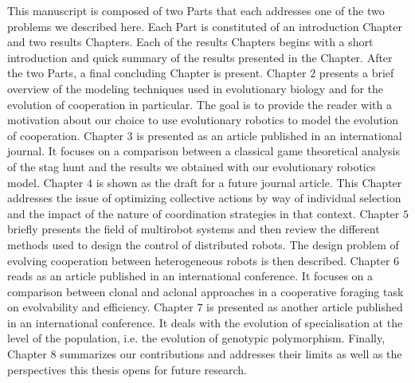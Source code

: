     This manuscript is composed of two Parts that each addresses one of the two problems we described here. Each Part is constituted of an introduction Chapter and two results Chapters. Each of the results Chapters begins with a short introduction and quick summary of the results presented in the Chapter. After the two Parts, a final concluding Chapter is present.
    Chapter $2$ presents a brief overview of the modeling techniques used in evolutionary biology and for the evolution of cooperation in particular. The goal is to provide the reader with a motivation about our choice to use evolutionary robotics to model the evolution of cooperation.
    Chapter $3$ is presented as an article published in an international journal. It focuses on a comparison between a classical game theoretical analysis of the stag hunt and the results we obtained with our evolutionary robotics model.
    Chapter $4$ is shown as the draft for a future journal article. This Chapter addresses the issue of optimizing collective actions by way of individual selection and the impact of the nature of coordination strategies in that context.
    Chapter $5$ briefly presents the field of multirobot systems and then review the different methods used to design the control of distributed robots. The design problem of evolving cooperation between heterogeneous robots is then described.
    Chapter $6$ reads as an article published in an international conference. It focuses on a comparison between clonal and aclonal approaches in a cooperative foraging task on evolvability and efficiency.
    Chapter $7$ is presented as another article published in an international conference. It deals with the evolution of specialisation at the level of the population, i.e. the evolution of genotypic polymorphism.
    Finally, Chapter $8$ summarizes our contributions and addresses their limits as well as the perspectives this thesis opens for future research.
